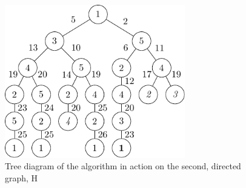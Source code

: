 \begin{figure}
\centering
\includegraphics[width=0.7\textwidth]{chapters/tsp/figs/ugraph-figure3}
\caption{\label{fig:tsp:dtree}Tree diagram of the algorithm in action on the second, directed graph, H}
\end{figure}


